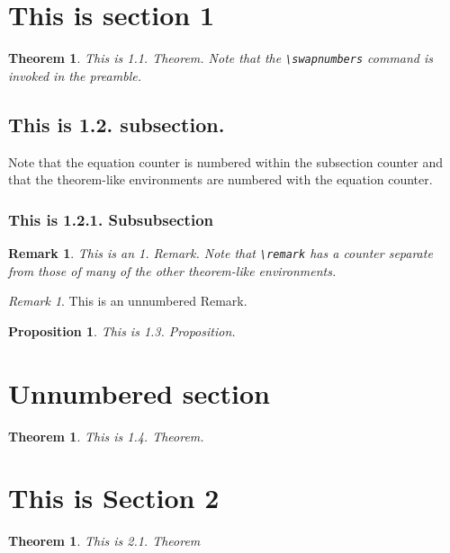 \documentclass[10pt]{amsart}
\numberwithin{equation}{subsection}
\theoremstyle{plain}
\newtheorem{thm}[subsection]{Theorem}
\newtheorem{prop}[subsection]{Proposition}
\newtheorem{remark}{Remark}
\theoremstyle{definition}
\theoremstyle{remark}
\newtheorem*{rem*}{Remark}
\begin{document}
\section{This is section 1}

\begin{thm}
This is 1.1. Theorem. Note that the \verb|\swapnumbers| command is invoked in the preamble.
\end{thm}

\subsection{This is 1.2. subsection.}

Note that the equation counter is numbered within the subsection counter and that the theorem-like environments are numbered with the equation counter.

\subsubsection{This is 1.2.1. Subsubsection}

\begin{remark}
This is an 1. Remark. Note that \verb|\remark| has a counter separate from those of many of the other theorem-like environments.
\end{remark}

\begin{rem*}
This is an unnumbered Remark.
\end{rem*}


\begin{prop}
This is 1.3. Proposition.
\end{prop}

\section*{Unnumbered section}

\begin{thm}
This is 1.4. Theorem.
\end{thm}


\section{This is Section 2}

\begin{thm}
This is 2.1. Theorem
\end{thm}
\end{document}
